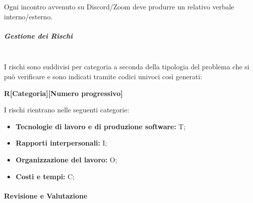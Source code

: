 Ogni incontro avvenuto su Discord/Zoom deve produrre un relativo verbale interno/esterno.

\subparagraph{Gestione dei Rischi}
\mbox{}\\
I rischi sono suddivisi per categoria a seconda della tipologia del problema che si può verificare e
sono indicati tramite codici univoci così generati:

\begin{center}
    \textbf{R[Categoria][Numero progressivo]}
\end{center}

I rischi rientrano nelle seguenti categorie:
\begin{itemize}
    \item \textbf{Tecnologie di lavoro e di produzione software:} T;
    \item \textbf{Rapporti interpersonali:} I;
    \item \textbf{Organizzazione del lavoro:} O;
    \item \textbf{Costi e tempi:} C;
\end{itemize}


\paragraph{Revisione e Valutazione}

